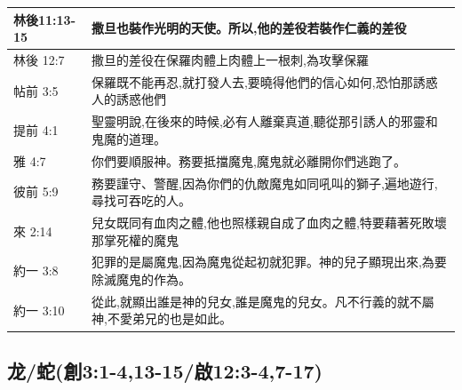 \begin{table}[H]
\begin{tabular}{p{2.5cm}|p{14.0cm}}
林後11:13-15&撒旦也裝作光明的天使。所以,他的差役若裝作仁義的差役\\\hline
林後 12:7&撒旦的差役在保羅肉體上肉體上一根刺,為攻擊保羅\\\hline
帖前 3:5&保羅既不能再忍,就打發人去,要曉得他們的信心如何,恐怕那誘惑人的誘惑他們\\\hline
提前 4:1&聖靈明說,在後來的時候,必有人離棄真道,聽從那引誘人的邪靈和鬼魔的道理。\\\hline
雅 4:7&你們要順服神。務要抵擋魔鬼,魔鬼就必離開你們逃跑了。\\\hline
彼前 5:9&務要謹守、警醒,因為你們的仇敵魔鬼如同吼叫的獅子,遍地遊行,尋找可吞吃的人。\\\hline
來 2:14&兒女既同有血肉之體,他也照樣親自成了血肉之體,特要藉著死敗壞那掌死權的魔鬼\\\hline
約一 3:8&犯罪的是屬魔鬼,因為魔鬼從起初就犯罪。神的兒子顯現出來,為要除滅魔鬼的作為。\\\hline
約一 3:10&從此,就顯出誰是神的兒女,誰是魔鬼的兒女。凡不行義的就不屬神,不愛弟兄的也是如此。\\\hline
\end{tabular}
\end{table}

\subsection{龙/蛇(創3:1-4,13-15/啟12:3-4,7-17)}

